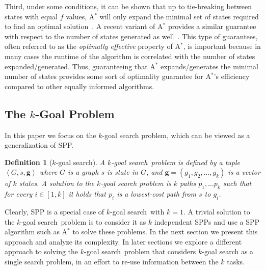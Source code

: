 \documentclass{aicom2e}
\newtheorem{definition}{Definition}
\newcommand{\kgs}{$k$-goal search}
\newcommand{\astar}{A$^*$}
\newcommand{\tuple}[1]{\ensuremath{\left \langle #1 \right \rangle }}
\begin{document}
Third, under some conditions, it can be shown that up to tie-breaking between states with equal $f$ values, \astar{} will only expand the minimal set of states required to find an optimal solution~\cite{dechter1985generalizedBestFirst}. 
A recent variant of \astar{} provides a similar guarantee with respect to the number of states generated as well~\cite{goldenberg2014enhanced}. This type of guarantees, often referred to as the {\em optimally effective} property of \astar{}, is  important because in many cases the runtime of the algorithm is correlated with the number of states expanded/generated. 
Thus, guaranteeing that \astar{} expands/generates the minimal number of states provides some sort of optimality guarantee for \astar{}'s efficiency compared to other equally informed algorithms. 



\subsection{The $k$-Goal Problem}
In this paper we focus on the $k$-goal search problem, which can be viewed as a generalization of SPP. 



\begin{definition}[$k$-goal search]
	A \kgs\ problem is defined by a tuple $\tuple{G,s, \textbf{g}}$
		where $G$ is a graph
		$s$ is state in $G$, 
		and $\textbf{g}=(g_1,g_2,\ldots,g_k)$ is a vector of $k$ states. 
	A solution to the \kgs{} problem is $k$ paths $p_1,\ldots p_k$ such that for every 
	$i\in [1,k]$ it holds that $p_i$ is a lowest-cost path from $s$ to $g_i$. 
\label{def:k-goal}
\end{definition}


Clearly, SPP is a special case of \kgs\ with $k=1$. A trivial solution to the \kgs\ problem is to consider it as $k$ independent SPPs and use a SPP algorithm such as \astar{} to solve these problems. In the next section we present this approach and analyze its complexity. 
In later sections we explore a different approach to solving the \kgs\ problem that considers \kgs{} as a single search problem, in an effort to re-use information between the $k$ tasks. 
\end{document}
